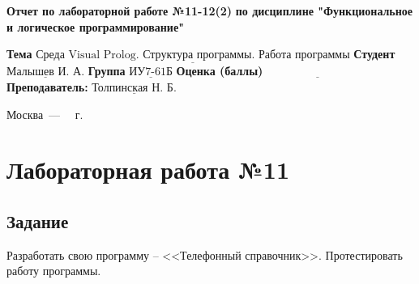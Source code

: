 \documentclass[12pt]{report}
\begin{document}
\begin{titlepage}
		
		\begin{center}
			\noindent\begin{minipage}{1.3\textwidth}\centering
				\Large\textbf{  Отчет по лабораторной работе №11-12(2)}\newline
				\textbf{по дисциплине \newline "Функциональное и логическое программирование"}\newline\newline
			\end{minipage}
		\end{center}
		
		\noindent\textbf{Тема} $\underline{\text{Среда Visual Prolog. Структура программы. Работа программы}}$\newline\newline
		\noindent\textbf{Студент} $\underline{\text{Малышев И. А.}}$\newline\newline
		\noindent\textbf{Группа} $\underline{\text{ИУ7-61Б}}$\newline\newline
		\noindent\textbf{Оценка (баллы)} $\underline{\text{~~~~~~~~~~~~~~~~~~~~~~~~~~~}}$\newline\newline
		\noindent\textbf{Преподаватель: } $\underline{\text{Толпинская Н. Б.}}$\newline\newline\newline
		
		\begin{center}
			\vfill
			Москва~---~\the\year
			~г.
		\end{center}
	\end{titlepage}
	
	
	\setcounter{page}{2}

\chapter*{Лабораторная работа №11}
\section*{Задание}

Разработать свою программу -- <<Телефонный справочник>>. Протестировать работу программы.
\end{document}
